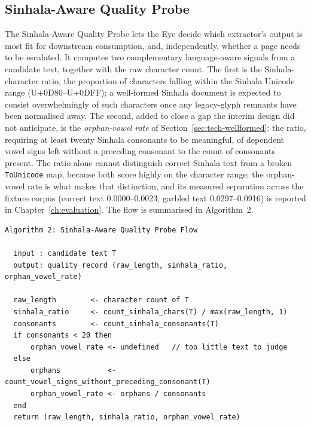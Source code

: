 \documentclass[12pt,a4paper,oneside]{report}
\begin{document}
\subsection{Sinhala-Aware Quality Probe}
\label{sec:impl-quality-probe}
The Sinhala-Aware Quality Probe lets the Eye decide which extractor's output is most fit for downstream consumption, and, independently, whether a page needs to be escalated. It computes two complementary language-aware signals from a candidate text, together with the raw character count. The first is the Sinhala-character ratio, the proportion of characters falling within the Sinhala Unicode range (U+0D80--U+0DFF); a well-formed Sinhala document is expected to consist overwhelmingly of such characters once any legacy-glyph remnants have been normalised away. The second, added to close a gap the interim design did not anticipate, is the \textit{orphan-vowel rate} of Section~\ref{sec:tech-wellformed}: the ratio, requiring at least twenty Sinhala consonants to be meaningful, of dependent vowel signs left without a preceding consonant to the count of consonants present. The ratio alone cannot distinguish correct Sinhala text from a broken \texttt{ToUnicode} map, because both score highly on the character range; the orphan-vowel rate is what makes that distinction, and its measured separation across the fixture corpus (correct text 0.0000--0.0023, garbled text 0.0297--0.0916) is reported in Chapter~\ref{ch:evaluation}. The flow is summarised in Algorithm~2.

\begin{verbatim}
Algorithm 2: Sinhala-Aware Quality Probe Flow

  input : candidate text T
  output: quality record (raw_length, sinhala_ratio, orphan_vowel_rate)

  raw_length        <- character count of T
  sinhala_ratio     <- count_sinhala_chars(T) / max(raw_length, 1)
  consonants        <- count_sinhala_consonants(T)
  if consonants < 20 then
      orphan_vowel_rate <- undefined   // too little text to judge
  else
      orphans           <- count_vowel_signs_without_preceding_consonant(T)
      orphan_vowel_rate <- orphans / consonants
  end
  return (raw_length, sinhala_ratio, orphan_vowel_rate)
\end{verbatim}
\end{document}
